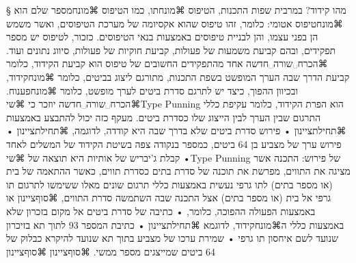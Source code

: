 § מהו קידוד?
במרבית שפות התכנות, הטיפוס ⌘מונח{תו}, כמו הטיפוס ⌘מונח{מספר שלם} הוא ⌘מונח{טיפוס אטומי}: כלומר, זהו טיפוס שהוא אקסיומה של מערכת הטיפוסים, ואשר משמש הן בפני עצמו, והן לבניית טיפוסים באמצעות בנאי הטיפוסים. כזכור, לטיפוס יש מספר תפקידים, ובהם קביעת משמעות של פעולות, קביעת חוקיות של פעולות, סיווג נתונים ועוד.
⌘הכרח␣שורה␣חדשה
אחד מהתפקידים החשובים של טיפוס הוא קביעת הקידוד, כלומר קביעת הדרך שבה הערך המופשט בשפת התכנות, מתורגם ליצוג בביטים, כלומר ⌘מונח{קידוד}, ובכיוון ההפוך, כיצד יש לתרגם סדרת ביטים לערך מופשט, כלומר ⌘מונח{פענוח}.
⌘הכרח␣שורה␣חדשה
יוזכר כי ⌘שי{Type Punning} הוא הפרת הקידוד, כלומר עקיפת כללי התרגום שבין הערך לבין הייצוג שלו כסדרת ביטים. מעקף כזה יכול להתבצע באמצעות
⌘תחילת{ציינון}
• פירוש סדרת ביטים שלא בדרך שבה היא קודדה, לדוגמה,
⌘תחילת{ציינון}
• פירוש ערך של מצביע בן 64 ביטים, כמספר בנקודה צפה בשיטת הקידוד של המשלים לאחד
• קבלת ג'יבריש של אותיות היא תוצאה של ⌘שי{Type Punning} של פירוש: התכנה אשר מציגה את התווים, מפרשת את תוכנה של סדרת בתים כסדרת תווים, כאשר ההתאמה של בית (או מספר בתים) לתו גרפי נעשית באמצעות כללי תרגום שונים מאלו ששימשו לתרגום תו גרפי אל בית (או מספר בתים) אצל התכנה שבה השתמשה סדרת התווים,
⌘סוף{ציינון}
או באמצעות הפעולה ההפוכה, כלומר,
• כתיבה של סדרת ביטים אל מקום בזכרון שלא באמצעות כללי ה⌘מונח{קידוד}, לדוגמא
⌘תחילת{ציינון}
• כתיבת המספר 93 לתוך תא בזיכרון שנועד לשם איחסון תו גרפי
• שמירת ערכו של מצביע בתוך תא שנועד להיקרא כבלוק של 64 ביטים שמייצגים מספר ממשי.
⌘סוף{ציינון}
⌘סוף{ציינון}

